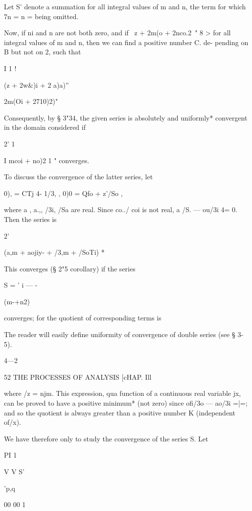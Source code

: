 Let S' denote a summation for all integral values of m and n, the term
for which 7n = n = being omitted.

Now, if ni and n are not both zero, and if \ z + 2m(o + 2nco.2\ " 8 >
for all integral values of m and n, then we can find a positive number
C. de- pending on B but not on 2, such that

I 1 !



(z + 2w\&)i + 2 a)a)''



 2m(Oi + 2710)2)"



Consequently, by § 3"34, the given series is absolutely and uniformly*
convergent in the domain considered if

2' 1

I mcoi + no)2 1 " converges.

To discuss the convergence of the latter series, let

0), = CTj 4- 1/3, , 0)0 = Qfo + z'/So ,

where a , a.,, /3i, /Sa are real. Since co../ coi is not real, a /S. —
ou/3i 4= 0. Then the series is

2'

 (a,m + aojiy- + /3,m + /SoTi) *

This converges (§ 2"5 corollary) if the series

S = ' i — -

(m-+n2)

converges; for the quotient of corresponding terms is

The reader will easily define uniformity of convergence of double
series (see § 3-5).

4—2



52 THE PROCESSES OF ANALYSIS [cHAP. Ill

where /z = njm. This expression, qua function of a continuous real
variable jx, can be proved to have a positive minimum* (not zero)
since ofi/3o — ao/3i =|=; and so the quotient is always greater than
a positive number K (independent of/x).

We have therefore only to study the convergence of the series S. Let

PI 1

V V S'



 'p,q



00 00 1

